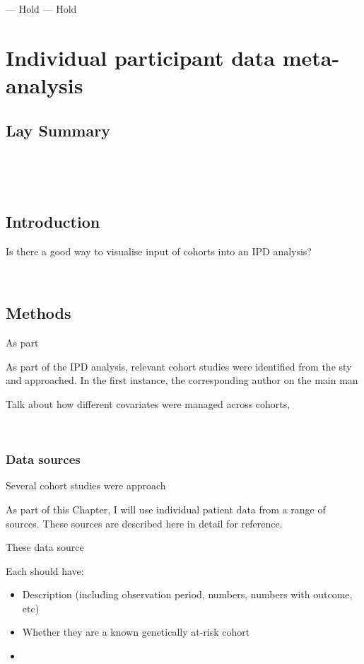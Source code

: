 \documentclass[a4paper, twoside]{templates/ociamthesis}
\providecommand{\tightlist}{%
  \setlength{\itemsep}{0pt}\setlength{\parskip}{0pt}}
\begin{document}
--- Hold --- Hold

\hypertarget{ipd-heading}{%
\chapter{Individual participant data meta-analysis}\label{ipd-heading}}

\minitoc 

\hypertarget{lay-summary-4}{%
\section{Lay Summary}\label{lay-summary-4}}

~

~

\hypertarget{introduction-2}{%
\section{Introduction}\label{introduction-2}}

Is there a good way to visualise input of cohorts into an IPD analysis?

~

\hypertarget{methods-2}{%
\section{Methods}\label{methods-2}}

As part

As part of the IPD analysis, relevant cohort studies were identified from the sty and approached. In the first instance, the corresponding author on the main man

Talk about how different covariates were managed across cohorts,

~

\hypertarget{data-sources}{%
\subsection{Data sources}\label{data-sources}}

Several cohort studies were approach

As part of this Chapter, I will use individual patient data from a range of sources. These sources are described here in detail for reference.

These data source

Each should have:

\begin{itemize}
\tightlist
\item
  Description (including observation period, numbers, numbers with outcome, etc)
\item
  Whether they are a known genetically at-risk cohort
\item
\end{itemize}
\end{document}
